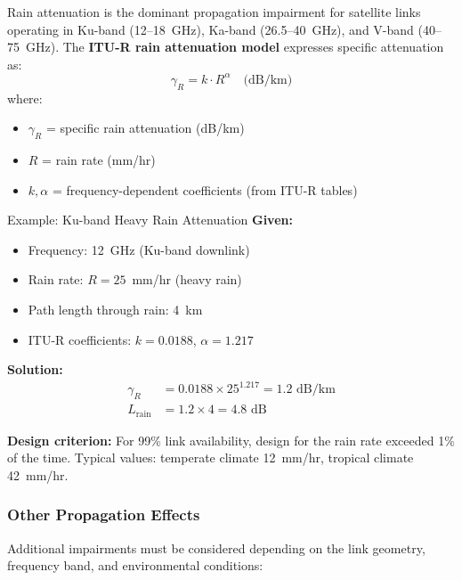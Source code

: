 Rain attenuation is the dominant propagation impairment for satellite links operating in Ku-band (12--18~GHz), Ka-band (26.5--40~GHz), and V-band (40--75~GHz). The \textbf{ITU-R rain attenuation model} expresses specific attenuation as:
\begin{equation}
\gamma_R = k \cdot R^{\alpha} \quad \text{(dB/km)}
\label{eq:rain-attenuation}
\end{equation}
where:
\begin{itemize}
\item $\gamma_R$ = specific rain attenuation (dB/km)
\item $R$ = rain rate (mm/hr)
\item $k, \alpha$ = frequency-dependent coefficients (from ITU-R tables)
\end{itemize}

\begin{calloutbox}{Example: Ku-band Heavy Rain Attenuation}
\textbf{Given:}
\begin{itemize}
\item Frequency: 12~GHz (Ku-band downlink)
\item Rain rate: $R = 25$~mm/hr (heavy rain)
\item Path length through rain: 4~km
\item ITU-R coefficients: $k = 0.0188$, $\alpha = 1.217$
\end{itemize}

\textbf{Solution:}
\begin{align*}
\gamma_R &= 0.0188 \times 25^{1.217} = 1.2\text{~dB/km} \\
L_{\text{rain}} &= 1.2 \times 4 = 4.8\text{~dB}
\end{align*}
\end{calloutbox}

\textbf{Design criterion:} For 99\% link availability, design for the rain rate exceeded 1\% of the time. Typical values: temperate climate 12~mm/hr, tropical climate 42~mm/hr.

\subsubsection{Other Propagation Effects}

Additional impairments must be considered depending on the link geometry, frequency band, and environmental conditions:

